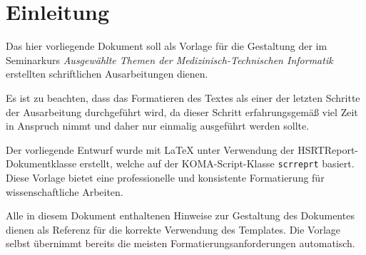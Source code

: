 
\chapter{Einleitung}
\label{chap:einleitung}

Das hier vorliegende Dokument soll als Vorlage für die Gestaltung der im Seminarkurs \emph{Ausgewählte Themen der Medizinisch-Technischen Informatik} erstellten schriftlichen Ausarbeitungen dienen.

Es ist zu beachten, dass das Formatieren des Textes als einer der letzten Schritte der Ausarbeitung durchgeführt wird, da dieser Schritt erfahrungsgemäß viel Zeit in Anspruch nimmt und daher nur einmalig ausgeführt werden sollte.

Der vorliegende Entwurf wurde mit \LaTeX{} unter Verwendung der HSRTReport-Dokumentklasse erstellt, welche auf der KOMA-Script-Klasse \texttt{scrreprt} basiert. Diese Vorlage bietet eine professionelle und konsistente Formatierung für wissenschaftliche Arbeiten.

Alle in diesem Dokument enthaltenen Hinweise zur Gestaltung des Dokumentes dienen als Referenz für die korrekte Verwendung des Templates. Die Vorlage selbst übernimmt bereits die meisten Formatierungsanforderungen automatisch.

